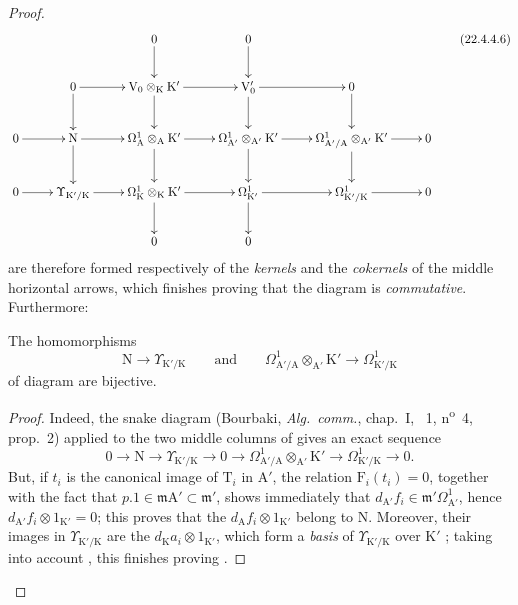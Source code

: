 \begin{proof}

\begin{equation}
\label{0.22.4.4.6}
  \xymatrix{
    && 0 \ar[d] & 0 \ar[d] && \\
    & 0 \ar[r] \ar[d] & \mathrm{V}_0\otimes_\mathrm{K}\mathrm{K}' \ar[r] \ar[d] & \mathrm{V}_0' \ar[r] \ar[d] & 0 \ar[d] & \\
    0 \ar[r] & \mathrm{N} \ar[r] \ar[d] & \Omega^1_\mathrm{A}\otimes_\mathrm{A}\mathrm{K}' \ar[r] \ar[d] &
      \Omega^1_{\mathrm{A}'}\otimes_{\mathrm{A}'}\mathrm{K}' \ar[r] \ar[d] &
      \Omega^1_{\mathrm{A}'/\mathrm{A}}\otimes_{\mathrm{A}'}\mathrm{K}' \ar[r] \ar[d] & 0 \\
    0 \ar[r] & \Upsilon_{\mathrm{K}'/\mathrm{K}} \ar[r] &
      \Omega^1_\mathrm{K}\otimes_\mathrm{K}\mathrm{K}' \ar[r] \ar[d] & \Omega^1_{\mathrm{K}'} \ar[r] \ar[d] &
      \Omega^1_{\mathrm{K}'/\mathrm{K}} \ar[r] & 0 \\
    && 0 & 0 &&
  }
  \tag{22.4.4.6}
\end{equation}
are therefore formed respectively of the \emph{kernels} and the \emph{cokernels} of the middle horizontal arrows, which finishes proving that the diagram is \emph{commutative}.
Furthermore:

\begin{lemma}[22.4.4.7]
\label{0.22.4.4.7}
The homomorphisms
\[
  \mathrm{N}\longrightarrow\Upsilon_{\mathrm{K}'/\mathrm{K}}\qquad\text{and}\qquad
  \Omega^1_{\mathrm{A}'/\mathrm{A}}\otimes_{\mathrm{A}'}\mathrm{K}'
  \longrightarrow\Omega^1_{\mathrm{K}'/\mathrm{K}}
\]
of diagram  are bijective.
\end{lemma}

\begin{proof}
Indeed, the snake diagram (Bourbaki, \emph{Alg.~comm.}, chap.~I, \textsection~1, n\textsuperscript{o}~4, prop.~2) applied to the two middle columns of  gives an exact sequence
\[
  0\longrightarrow\mathrm{N}\longrightarrow\Upsilon_{\mathrm{K}'/\mathrm{K}}\longrightarrow0
  \longrightarrow\Omega^1_{\mathrm{A}'/\mathrm{A}}\otimes_{\mathrm{A}'}\mathrm{K}'
  \longrightarrow\Omega^1_{\mathrm{K}'/\mathrm{K}}\longrightarrow0.
\]
But, if $t_i$ is the canonical image of $\mathrm{T}_i$ in $\mathrm{A}'$, the relation $\mathrm{F}_i(t_i)=0$, together with the fact that $p.1\in\mathfrak{m}\mathrm{A}'\subset\mathfrak{m}'$, shows immediately that $d_{\mathrm{A}'}f_i\in\mathfrak{m}'\Omega^1_{\mathrm{A}'}$, hence $d_{\mathrm{A}'}f_i\otimes 1_{\mathrm{K}'}=0$;
this proves that the $d_\mathrm{A}f_i\otimes 1_{\mathrm{K}'}$ belong to $\mathrm{N}$.
Moreover, their images in $\Upsilon_{\mathrm{K}'/\mathrm{K}}$ are the $d_\mathrm{K}a_i\otimes 1_{\mathrm{K}'}$, which form a \emph{basis} of $\Upsilon_{\mathrm{K}'/\mathrm{K}}$ over $\mathrm{K}'$ ; taking into account , this finishes proving .
\end{proof}
\end{proof}

